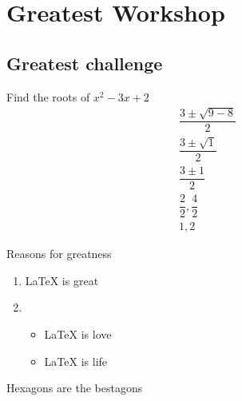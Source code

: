\documentclass{article}
\begin{document}
\section{Greatest Workshop}
\subsection*{Greatest challenge}

Find the roots of $x^2 -3x + 2$
\begin{gather}
    \dfrac{3 \pm \sqrt{9 - 8}}{2}\\
    \dfrac{3 \pm \sqrt 1}{2}\\
    \dfrac{3 \pm 1}{2}\\
    \dfrac{2}{2}, \dfrac{4}{2}\\
    1,2
\end{gather}

Reasons for greatness
\begin{enumerate}
    \item LaTeX is great
    \item \begin{itemize}
         \item LaTeX is love
         \item LaTeX is life
    \end{itemize}
\end{enumerate}

\clearpage

Hexagons are the bestagons
\end{document}
